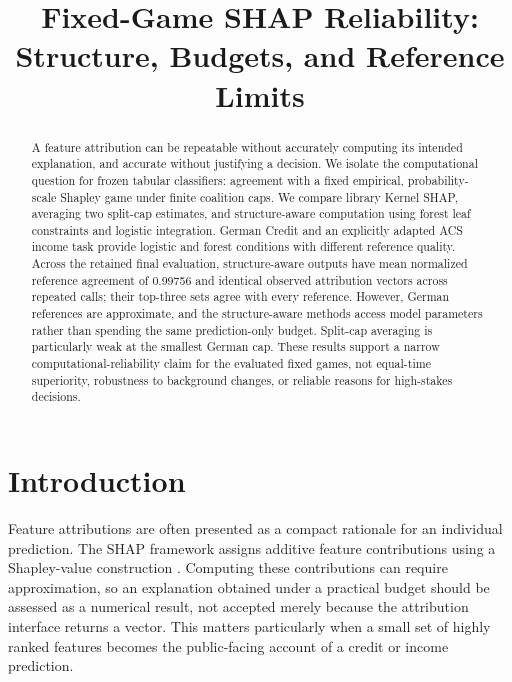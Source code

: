 \documentclass{article}
\title{Fixed-Game SHAP Reliability:\\Structure, Budgets, and Reference Limits}
\author{}
\begin{document}
\maketitle

\begin{abstract}
A feature attribution can be repeatable without accurately computing its intended explanation, and accurate without justifying a decision. We isolate the computational question for frozen tabular classifiers: agreement with a fixed empirical, probability-scale Shapley game under finite coalition caps. We compare library Kernel SHAP, averaging two split-cap estimates, and structure-aware computation using forest leaf constraints and logistic integration. German Credit and an explicitly adapted ACS income task provide logistic and forest conditions with different reference quality. Across the retained final evaluation, structure-aware outputs have mean normalized reference agreement of 0.99756 and identical observed attribution vectors across repeated calls; their top-three sets agree with every reference. However, German references are approximate, and the structure-aware methods access model parameters rather than spending the same prediction-only budget. Split-cap averaging is particularly weak at the smallest German cap. These results support a narrow computational-reliability claim for the evaluated fixed games, not equal-time superiority, robustness to background changes, or reliable reasons for high-stakes decisions.
\end{abstract}

\section{Introduction}
Feature attributions are often presented as a compact rationale for an individual prediction. The SHAP framework assigns additive feature contributions using a Shapley-value construction \citep{Lundberg2017,Shapley1953}. Computing these contributions can require approximation, so an explanation obtained under a practical budget should be assessed as a numerical result, not accepted merely because the attribution interface returns a vector. This matters particularly when a small set of highly ranked features becomes the public-facing account of a credit or income prediction.
\end{document}
